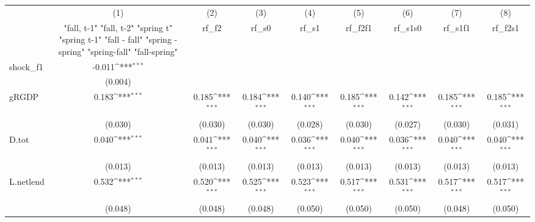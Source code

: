 {
\def\sym#1{\ifmmode^{#1}\else\(^{#1}\)\fi}
\begin{tabular}{l*{8}{c}}
\toprule
            &\multicolumn{1}{c}{(1)}&\multicolumn{1}{c}{(2)}&\multicolumn{1}{c}{(3)}&\multicolumn{1}{c}{(4)}&\multicolumn{1}{c}{(5)}&\multicolumn{1}{c}{(6)}&\multicolumn{1}{c}{(7)}&\multicolumn{1}{c}{(8)}\\
            &\multicolumn{1}{c}{  "fall, t-1" "fall, t-2" "spring t" "spring t-1"  "fall - fall" "spring - spring" "spring-fall" "fall-spring" }&\multicolumn{1}{c}{rf\_f2}&\multicolumn{1}{c}{rf\_s0}&\multicolumn{1}{c}{rf\_s1}&\multicolumn{1}{c}{rf\_f2f1}&\multicolumn{1}{c}{rf\_s1s0}&\multicolumn{1}{c}{rf\_s1f1}&\multicolumn{1}{c}{rf\_f2s1}\\
\midrule
shock\_f1    &      -0.011\sym{***}&                     &                     &                     &                     &                     &                     &                     \\
            &     (0.004)         &                     &                     &                     &                     &                     &                     &                     \\
\addlinespace
gRGDP       &       0.183\sym{***}&       0.185\sym{***}&       0.184\sym{***}&       0.140\sym{***}&       0.185\sym{***}&       0.142\sym{***}&       0.185\sym{***}&       0.185\sym{***}\\
            &     (0.030)         &     (0.030)         &     (0.030)         &     (0.028)         &     (0.030)         &     (0.027)         &     (0.030)         &     (0.031)         \\
\addlinespace
D.tot       &       0.040\sym{***}&       0.041\sym{***}&       0.040\sym{***}&       0.036\sym{***}&       0.040\sym{***}&       0.036\sym{***}&       0.040\sym{***}&       0.040\sym{***}\\
            &     (0.013)         &     (0.013)         &     (0.013)         &     (0.013)         &     (0.013)         &     (0.013)         &     (0.013)         &     (0.013)         \\
\addlinespace
L.netlend   &       0.532\sym{***}&       0.520\sym{***}&       0.525\sym{***}&       0.523\sym{***}&       0.517\sym{***}&       0.531\sym{***}&       0.517\sym{***}&       0.517\sym{***}\\
            &     (0.048)         &     (0.048)         &     (0.048)         &     (0.050)         &     (0.050)         &     (0.050)         &     (0.048)         &     (0.050)         \\

\end{tabular}}

